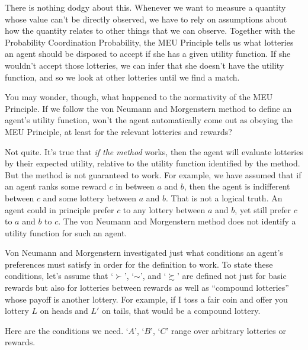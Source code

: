 There is nothing dodgy about this. Whenever we want to measure a
quantity whose value can't be directly observed, we have to rely on
assumptions about how the quantity relates to other things that we can
observe. Together with the Probability Coordination Probability, the
MEU Principle tells us what lotteries an agent should be disposed to
accept if she has a given utility function. If she wouldn't accept
those lotteries, we can infer that she doesn't have the utility
function, and so we look at other lotteries until we find a match.

You may wonder, though, what happened to the normativity of the MEU
Principle. If we follow the von Neumann and Morgenstern method to
define an agent's utility function, won't the agent automatically come
out as obeying the MEU Principle, at least for the relevant lotteries
and rewards? 

Not quite. It's true that \emph{if the method} works, then the agent
will evaluate lotteries by their expected utility, relative to the
utility function identified by the method. But the method is not
guaranteed to work. For example, we have assumed that if an agent
ranks some reward $c$ in between $a$ and $b$, then the agent is
indifferent between $c$ and some lottery between $a$ and $b$. That is
not a logical truth. An agent could in principle prefer $c$ to any
lottery between $a$ and $b$, yet still prefer $c$ to $a$ and $b$ to
$c$.  The von Neumann and Morgenstern method does not identify a
utility function for such an agent.

Von Neumann and Morgenstern investigated just what conditions an
agent's preferences must satisfy in order for the definition to work.
To state these conditions, let's assume that `$\succ$', `$\sim$', and
`$\succsim$' are defined not just for basic rewards but also for
lotteries between rewards as well as ``compound lotteries'' whose
payoff is another lottery. For example, if I toss a fair coin and
offer you lottery $L$ on heads and $L'$ on tails, that would be a
compound lottery.

Here are the conditions we need. `$A$', `$B$', `$C$' range over
arbitrary lotteries or rewards.

